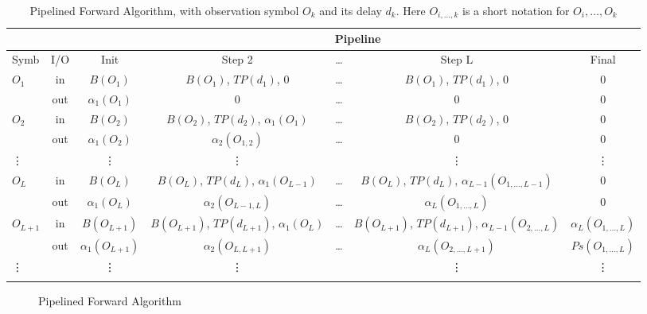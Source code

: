\documentclass[mscthesis]{usiinfthesis}
\begin{document}
\begin{table}
    \footnotesize
    \begin{center}
    \begin{tabular}{|l|*{6}{c|}}
    \cline{3-7}
    \multicolumn{2}{c|}{} & \multicolumn{5}{c|}{Pipeline}\\
    \hline
    Symb & I/O & Init & Step 2 & \dots & Step L & Final \\
    \hline
    \hline
    $O_1$ & in
        & $B(O_1)$ & $B(O_1)$, $TP(d_1)$, 0
        & \dots
        & $B(O_1)$, $TP(d_1)$, 0 & 0 \\
        & out
        & $\alpha_1(O_1)$ & 0
        & \dots
        & 0 & 0 \\
    \arrayrulecolor{mysmokegray}\hline
    $O_2$ & in
        & $B(O_2)$ & $B(O_2)$, $TP(d_2)$, $\alpha_1(O_1)$
        & \dots
        & $B(O_2)$, $TP(d_2)$, 0 & 0 \\
        & out
        & $\alpha_1(O_2)$ & $\alpha_2(O_{1,2})$
        & \dots
        & 0 & 0 \\
    \hline
    \vdots & & \vdots & \vdots & & \vdots & \vdots \\
    \hline
    $O_{L}$ & in
        & $B(O_L)$ & $B(O_L)$, $TP(d_L)$, $\alpha_1(O_{L-1})$
        & \dots
        & $B(O_L)$, $TP(d_L)$, $\alpha_{L-1}(O_{1,\dots,{L-1}})$ & 0 \\
        & out
        & $\alpha_1(O_L)$ & $\alpha_2(O_{{L-1},L})$
        & \dots
        & $\alpha_L(O_{1,\dots,L})$ & 0 \\
    \hline
    $O_{L+1}$ & in
        & $B(O_{L+1})$ & $B(O_{L+1})$, $TP(d_{L+1})$, $\alpha_1(O_L)$
        & \dots
        & $B(O_{L+1})$, $TP(d_{L+1})$, $\alpha_{L-1}(O_{2,\dots,L})$ & $\alpha_L(O_{1,\dots,L})$ \\
        & out
        & $\alpha_1(O_{L+1})$ & $\alpha_2(O_{L,{L+1}})$
        & \dots
        & $\alpha_L(O_{2,\dots,{L+1}})$ & $Ps(O_{1,\dots,L})$ \\
    \hline
    \vdots & & \vdots & \vdots & & \vdots & \vdots \\
    \arrayrulecolor{black}\hline
    \end{tabular}
    \end{center}
    \caption{Pipelined Forward Algorithm, with observation symbol $O_k$ and its
        delay $d_k$. Here $O_{i, \dots, k}$ is a short notation for $O_i, \dots,
        O_k$}
    \label{tab:pipeline}
\end{table}

\begin{figure}
    \centering
    
    \caption{Pipelined Forward Algorithm}
    \label{fig:pipeline}
\end{figure}
\end{document}
